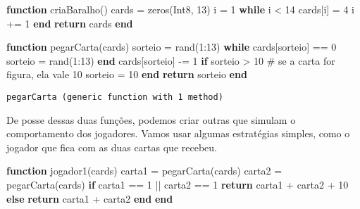 \documentclass[
  letterpaper,
  DIV=11,
  numbers=noendperiod]{scrreprt}
\newenvironment{Shaded}{\begin{snugshade}}{\end{snugshade}}
\newcommand{\CommentTok}[1]{\textcolor[rgb]{0.37,0.37,0.37}{#1}}
\newcommand{\ControlFlowTok}[1]{\textcolor[rgb]{0.00,0.23,0.31}{\textbf{#1}}}
\newcommand{\DataTypeTok}[1]{\textcolor[rgb]{0.68,0.00,0.00}{#1}}
\newcommand{\FloatTok}[1]{\textcolor[rgb]{0.68,0.00,0.00}{#1}}
\newcommand{\FunctionTok}[1]{\textcolor[rgb]{0.28,0.35,0.67}{#1}}
\newcommand{\KeywordTok}[1]{\textcolor[rgb]{0.00,0.23,0.31}{\textbf{#1}}}
\newcommand{\NormalTok}[1]{\textcolor[rgb]{0.00,0.23,0.31}{#1}}
\newcommand{\OperatorTok}[1]{\textcolor[rgb]{0.37,0.37,0.37}{#1}}
\begin{document}
\begin{Shaded}
\begin{Highlighting}[]
\KeywordTok{function} \FunctionTok{criaBaralho}\NormalTok{()}
\NormalTok{  cards }\OperatorTok{=} \FunctionTok{zeros}\NormalTok{(}\DataTypeTok{Int8}\NormalTok{, }\FloatTok{13}\NormalTok{)}
\NormalTok{  i }\OperatorTok{=} \FloatTok{1}
  \ControlFlowTok{while}\NormalTok{ i }\OperatorTok{\textless{}} \FloatTok{14}
\NormalTok{    cards[i] }\OperatorTok{=} \FloatTok{4}
\NormalTok{    i }\OperatorTok{+=} \FloatTok{1}
  \ControlFlowTok{end}
  \ControlFlowTok{return}\NormalTok{ cards}
\KeywordTok{end}

\KeywordTok{function} \FunctionTok{pegarCarta}\NormalTok{(cards)}
\NormalTok{  sorteio }\OperatorTok{=} \FunctionTok{rand}\NormalTok{(}\FloatTok{1}\OperatorTok{:}\FloatTok{13}\NormalTok{)}
  \ControlFlowTok{while}\NormalTok{ cards[sorteio] }\OperatorTok{==} \FloatTok{0}
\NormalTok{    sorteio }\OperatorTok{=} \FunctionTok{rand}\NormalTok{(}\FloatTok{1}\OperatorTok{:}\FloatTok{13}\NormalTok{)}
  \ControlFlowTok{end}
\NormalTok{  cards[sorteio] }\OperatorTok{{-}=} \FloatTok{1}
  \ControlFlowTok{if}\NormalTok{ sorteio }\OperatorTok{\textgreater{}} \FloatTok{10}  \CommentTok{\# se a carta for figura, ela vale 10}
\NormalTok{    sorteio }\OperatorTok{=} \FloatTok{10}
  \ControlFlowTok{end}  
  \ControlFlowTok{return}\NormalTok{ sorteio}
\KeywordTok{end}
\end{Highlighting}
\end{Shaded}

\begin{verbatim}
pegarCarta (generic function with 1 method)
\end{verbatim}

De posse dessas duas funções, podemos criar outras que simulam o
comportamento dos jogadores. Vamos usar algumas estratégias simples,
como o jogador que fica com as duas cartas que recebeu.

\begin{Shaded}
\begin{Highlighting}[]
\KeywordTok{function} \FunctionTok{jogador1}\NormalTok{(cards)}
\NormalTok{  carta1 }\OperatorTok{=} \FunctionTok{pegarCarta}\NormalTok{(cards)}
\NormalTok{  carta2 }\OperatorTok{=} \FunctionTok{pegarCarta}\NormalTok{(cards)}
  \ControlFlowTok{if}\NormalTok{ carta1 }\OperatorTok{==} \FloatTok{1} \OperatorTok{||}\NormalTok{ carta2 }\OperatorTok{==} \FloatTok{1}
    \ControlFlowTok{return}\NormalTok{ carta1 }\OperatorTok{+}\NormalTok{ carta2 }\OperatorTok{+} \FloatTok{10}
  \ControlFlowTok{else}
    \ControlFlowTok{return}\NormalTok{ carta1 }\OperatorTok{+}\NormalTok{ carta2}
  \ControlFlowTok{end}  
\KeywordTok{end}
\end{Highlighting}
\end{Shaded}
\end{document}

